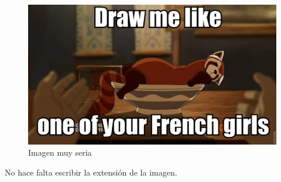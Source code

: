 \documentclass[10pt,a4paper,titlepage]{article} %
\begin{document}
	\begin{figure}[H]
		\centering
		\includegraphics[scale=0.3]{images/imagen2}
		\caption{Imagen muy seria}
	\end{figure}

	No hace falta escribir la extensión de la imagen.
\end{document}
